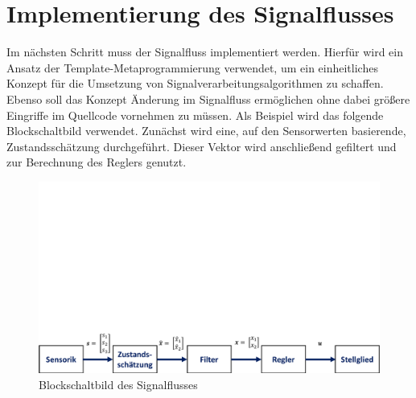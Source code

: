 \section{Implementierung des Signalflusses}
Im nächsten Schritt muss der Signalfluss implementiert werden. Hierfür wird ein Ansatz der Template-Metaprogrammierung verwendet, um ein einheitliches Konzept für die Umsetzung von Signalverarbeitungsalgorithmen zu schaffen. Ebenso soll das Konzept Änderung im Signalfluss ermöglichen ohne dabei größere Eingriffe im Quellcode vornehmen zu müssen. Als Beispiel wird das folgende Blockschaltbild verwendet.
Zunächst wird eine, auf den Sensorwerten basierende, Zustandsschätzung durchgeführt. Dieser Vektor wird anschließend gefiltert und zur Berechnung des Reglers genutzt.
\begin{figure}[!h]
\centering
\includegraphics[width=0.9\linewidth, trim={0cm 0cm 0cm 14cm}, clip]{img/SW_1_Signalfluss_BSB.pdf}
\caption{Blockschaltbild des Signalflusses}
\end{figure}

